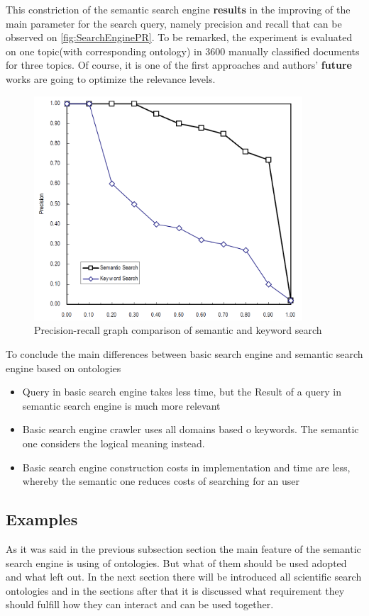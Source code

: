		This constriction of the semantic search engine \textbf{results} in the improving of the main parameter for the search query, namely precision and recall that can be observed on \autoref{fig:SearchEnginePR}. To be remarked, the experiment is evaluated on one topic(with corresponding ontology) in  3600 manually classified documents for three topics. Of course, it is one of the first approaches and authors' \textbf{future} works are going to optimize the relevance levels.
		\begin{figure}
			\centering
			\includegraphics[width=10cm]{images/SearchEnginePR.PNG}
			\caption{Precision-recall graph comparison of semantic and keyword search\cite[p. 1918]{Fang05}}
			\label{fig:SearchEnginePR}
		\end{figure}
		To conclude the main differences between basic search engine and semantic search engine based on ontologies\cite[p.653]{Gup12}
			\begin{itemize}
				\item Query in basic search engine takes less time, but the  Result of a query in semantic search engine is much more relevant
				\item Basic search engine crawler uses all domains based o keywords. The semantic one considers the logical meaning instead. 
				\item Basic search engine construction costs in implementation and time are less, whereby the semantic one reduces costs of searching for an user   
			\end{itemize} 
		\subsection{Examples}
		As it was said in the previous subsection section the main feature of the semantic search engine is using of ontologies. But what of them should be used adopted and what left out. In the next section there will be introduced all scientific search ontologies \frqq and in the sections after that it is discussed what requirement they should fulfill how they can interact and can be used together.
		
